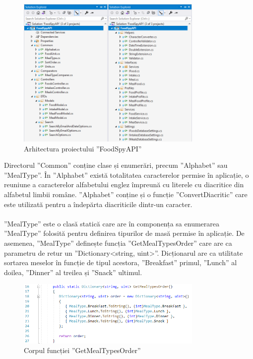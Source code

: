 \begin{figure}[!htb]
	\centering
	\includegraphics[width=0.8\textwidth]
	{../LaTeX/Images/fsapi_structura.PNG}
	\caption{Arhitectura proiectului ”FoodSpyAPI”}
	\label{fig:617}
\end{figure}

Directorul ”Common” conține clase și enumerări, precum ”Alphabet” sau ”MealType”. În ”Alphabet” există totalitatea caracterelor permise în aplicație, o reuniune a caracterelor alfabetului englez împreună cu literele cu diacritice din alfabetul limbii române. ”Alphabet” conține și o funcție ”ConvertDiacritic” care este utilizată pentru a îndepărta diacriticile dintr-un caracter.
\\ \\
”MealType” este o clasă statică care are în componența sa enumerarea ”MealType” folosită pentru definirea tipurilor de masă permise în aplicație. De asemenea, ”MealType” definește funcția ”GetMealTypesOrder” care are ca parametru de retur un ”Dictionary<string, uint>”. Dicționarul are ca utilitate sortarea meselor în funcție de tipul acestora, ”Breakfast” primul, ”Lunch” al doilea, ”Dinner” al treilea și ”Snack” ultimul.

\begin{figure}[!htb]
	\centering
	\includegraphics[width=0.8\textwidth]
	{../LaTeX/Images/fsapi_mealtype.PNG}
	\caption{Corpul funcției ”GetMealTypesOrder”}
	\label{fig:618}
\end{figure}

